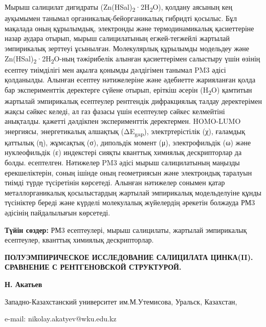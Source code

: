 Мырыш салицилат дигидраты
(Zn(HSal)\textsubscript{2}·2H\textsubscript{2}O), қолдану аясының кең
ауқымымен танымал органикалық-бейорганикалық гибридті қосылыс. Бұл
мақалада оның құрылымдық, электронды және термодинамикалық қасиеттеріне
назар аудара отырып, мырыш салицилатының егжей-тегжейлі жартылай
эмпирикалық зерттеуі ұсынылған. Молекулярлық құрылымды модельдеу және
Zn(HSal)\textsubscript{2}·2H\textsubscript{2}O-ның тәжірибелік алынған
қасиеттерімен салыстыру үшін өзінің есептеу тиімділігі мен ақылға
қонымды дәлдігімен танымал PM3 әдісі қолданылды. Алынған есептеу
нәтижелеріне және әдебиетте жарияланған қолда бар эксперименттік
деректерге сүйене отырып, еріткіш әсерін (H\textsubscript{2}O) қамтитын
жартылай эмпирикалық есептеулер рентгендік дифракциялық талдау
деректерімен жақсы сәйкес келеді, ал газ фазасы үшін есептеулер сәйкес
келмейтіні анықталды. қажетті дәлдікпен эксперименттік деректермен.
HOMO-LUMO энергиясы, энергетикалық алшақтық (ΔE\textsubscript{gap}),
электртерістілік (χ), ғаламдық қаттылық (η), жұмсақтық (σ), дипольдік
момент (μ), электрофильдік (ω) және нуклеофильдік (ε) индекстері сияқты
кванттық химиялық дескрипторлар да болды. есептелген. Нәтижелер PM3
әдісі мырыш салицилатының маңызды ерекшеліктерін, соның ішінде оның
геометриясын және электрондық таралуын тиімді түрде түсіретінін
көрсетеді. Алынған нәтижелер сонымен қатар металлорганикалық
қосылыстардың жартылай эмпирикалық модельделуіне құнды түсініктер береді
және күрделі молекулалық жүйелердің әрекетін болжауда РМ3 әдісінің
пайдалылығын көрсетеді.

{\bfseries Түйін сөздер:} РМ3 есептеулері, мырыш салицилаты, жартылай
эмпирикалық есептеулер, кванттық химиялық дескрипторлар.

{\bfseries ПОЛУЭМПИРИЧЕСКОЕ ИССЛЕДОВАНИЕ САЛИЦИЛАТА ЦИНКА(II). СРАВНЕНИЕ С
РЕНТГЕНОВСКОЙ СТРУКТУРОЙ.}

{\bfseries Н. Акатьев}

Западно-Казахстанский университет им.М.Утемисова, Уральск, Казахстан,

e-mail: nikolay.akatyev@wku.edu.kz

